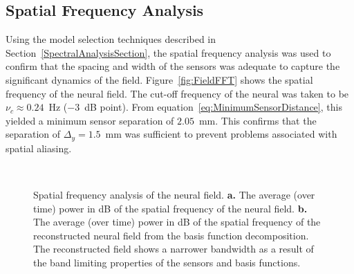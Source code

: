 \documentclass[10pt,a4paper]{article}
\begin{document}
\subsection{Spatial Frequency Analysis} 
Using the model selection techniques described in Section~\ref{SpectralAnalysisSection}, the spatial frequency analysis was used to confirm that the spacing and width of the sensors was adequate to capture the significant dynamics of the field. Figure~\ref{fig:FieldFFT} shows the spatial frequency of the neural field. The cut-off frequency of the neural was taken to be $\nu_c \approx 0.24$~Hz ($-3$~dB point). From equation~\ref{eq:MinimumSensorDistance}, this yielded a minimum sensor separation of $2.05$~mm. This confirms that the separation of $\Delta_{y} = 1.5$~mm was sufficient to prevent problems associated with spatial aliasing.
\begin{figure}
\centering
{}
\\
\caption{Spatial frequency analysis of the neural field. \textbf{a.} The average (over time) power in dB of the spatial frequency of the neural field. \textbf{b.} The average (over time) power in dB of the spatial frequency of the reconstructed neural field from the basis function decomposition. The reconstructed field shows a narrower bandwidth as a result of the band limiting properties of the sensors and basis functions.}
\label{fig:FFTTrueEstimate}
\end{figure}
\end{document}

